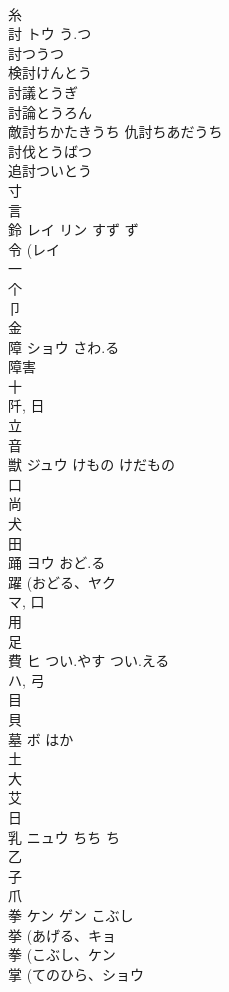 \documentclass[8pt]{extreport}
\begin{document}
\begin{CJK}{UTF8}{min}
\\	糸 
\\	討	トウ	う.つ	
\\	討つうつ 
\\	検討けんとう 
\\	討議とうぎ 
\\	討論とうろん 
\\	敵討ちかたきうち 仇討ちあだうち 
\\	討伐とうばつ 
\\	追討ついとう 
\\	寸 
\\	言 
\\	鈴	レイ リン	すず ず	
\\	令 (レイ 
\\	一 
\\	个 
\\	卩 
\\	金 
\\	障	ショウ	さわ.る	
\\	障害 
\\	十 
\\	阡, 日 
\\	立 
\\	音 
\\	獣	ジュウ	けもの けだもの	
\\	口 
\\	尚 
\\	犬 
\\	田 
\\	踊	ヨウ	おど.る	
\\	躍 (おどる、ヤク 
\\	マ, 口 
\\	用 
\\	足 
\\	費	ヒ	つい.やす つい.える	
\\	ハ, 弓 
\\	目 
\\	貝 
\\	墓	ボ	はか	
\\	土 
\\	大 
\\	艾 
\\	日 
\\	乳	ニュウ	ちち ち	
\\	乙 
\\	子 
\\	爪 
\\	拳	ケン ゲン	こぶし	
\\	挙 (あげる、キョ 
\\	拳 (こぶし、ケン 
\\	掌 (てのひら、ショウ 

\end{CJK}
\end{document}

